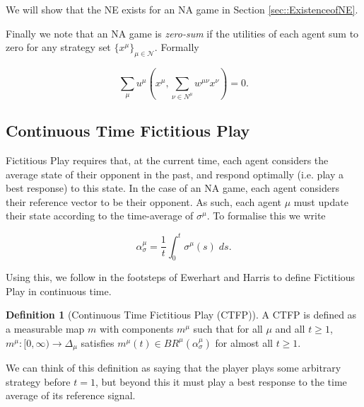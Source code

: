 \documentclass{article}
\theoremstyle{definition}
\newtheorem*{definition}{Definition}
\newcommand{\agentset}{\mathcal{N}}
\newcommand{\wmunu}{w^{\mu \nu}}
\newcommand{\xmu}{x^{\mu}}
\newcommand{\xnu}{x^{\nu}}
\newcommand{\refmu}{\sigma^{\mu}}
\newcommand{\avgref}[1]{\alpha_\sigma^{#1}}
\newcommand{\weightedsum}{ \sum_{\nu \in N^\mu} \wmunu \xnu}
\begin{document}
	We will show that the NE exists for an NA game in Section \ref{sec::ExistenceofNE}. 
	
	Finally we note that an NA game is \emph{zero-sum} if the utilities of each agent sum to zero for any strategy set $\{ \xmu \}_{\mu \in \agentset}$. Formally

	\begin{equation}
		\sum_\mu u^\mu(\xmu, \weightedsum) = 0.
	\end{equation}

	\subsection{Continuous Time Fictitious Play}
	\label{sec::CTFP}    

	Fictitious Play requires that, at the current time, each agent considers the average state
	of their opponent in the past, and respond optimally (i.e. play a best response) to this state. In the case of an NA game, each agent considers their reference vector to be their
	opponent. As such, each agent $\mu$ must update their state according to the time-average of
	$\refmu$. To formalise this we write

	\begin{equation}
		\avgref{\mu} = \frac{1}{t} \int_0^t \refmu(s) \; ds.
	\end{equation}

	Using this, we follow in the footsteps of Ewerhart \cite{} and Harris \cite{} to define
	Fictitious Play in continuous time.
%
	\begin{definition}[Continuous Time Fictitious Play (CTFP)]
		A CTFP is defined as a measurable map $m$ with components $m^\mu$ such that for all $\mu$
		and all $t \geq 1$, $m^\mu: [0, \infty) \rightarrow \Delta_\mu$ satisfies $m^\mu(t) \in
		BR^\mu(\alpha_{\sigma}^\mu)$ for almost all $t \geq 1$.
	\end{definition}

	We can think of this definition as saying that the player plays some arbitrary strategy before
	$t = 1$, but beyond this it must play a best response to the time average of its reference
	signal.
	
\end{document}
